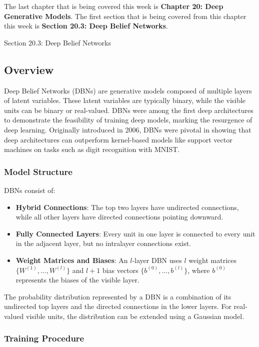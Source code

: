 The last chapter that is being covered this week is \textbf{Chapter 20: Deep Generative Models}. The first section that is being covered from this chapter this week is \textbf{Section 20.3: Deep Belief Networks}.

\begin{notes}{Section 20.3: Deep Belief Networks}
    \subsection*{Overview}

    Deep Belief Networks (DBNs) are generative models composed of multiple layers of latent variables. These latent variables are typically binary, while the visible units can be binary or real-valued. DBNs were among the first deep architectures to demonstrate the feasibility of training deep models, marking the resurgence of deep learning. Originally introduced in 2006, DBNs were pivotal in showing that deep architectures can outperform kernel-based models like support vector machines on tasks such as digit recognition with MNIST.
    
    \subsubsection*{Model Structure}
    
    DBNs consist of:
    \begin{itemize}
        \item \textbf{Hybrid Connections}: The top two layers have undirected connections, while all other layers have directed connections pointing downward.
        \item \textbf{Fully Connected Layers}: Every unit in one layer is connected to every unit in the adjacent layer, but no intralayer connections exist.
        \item \textbf{Weight Matrices and Biases}: An $l$-layer DBN uses $l$ weight matrices $\{W^{(1)}, \dots, W^{(l)}\}$ and $l+1$ bias vectors $\{b^{(0)}, \dots, b^{(l)}\}$, where $b^{(0)}$ represents the biases of the visible layer.
    \end{itemize}
    
    The probability distribution represented by a DBN is a combination of its undirected top layers and the directed connections in the lower layers. For real-valued visible units, the distribution can be extended using a Gaussian model.
    
    \subsubsection*{Training Procedure}
    

\end{notes}
